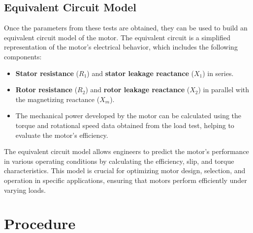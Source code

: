 \documentclass[12pt,a4paper]{report}
\begin{document}
\subsection{Equivalent Circuit Model}
Once the parameters from these tests are obtained, they can be used to build an equivalent circuit model of the motor. The equivalent circuit is a simplified representation of the motor’s electrical behavior, which includes the following components:
\begin{itemize}
    \item \textbf{Stator resistance} ($R_1$) and \textbf{stator leakage reactance} ($X_1$) in series.
    \item \textbf{Rotor resistance} ($R_2$) and \textbf{rotor leakage reactance} ($X_2$) in parallel with the magnetizing reactance ($X_m$).
    \item The mechanical power developed by the motor can be calculated using the torque and rotational speed data obtained from the load test, helping to evaluate the motor’s efficiency.
\end{itemize}

The equivalent circuit model allows engineers to predict the motor's performance in various operating conditions by calculating the efficiency, slip, and torque characteristics. This model is crucial for optimizing motor design, selection, and operation in specific applications, ensuring that motors perform efficiently under varying loads.

\section{Procedure}
\end{document}
